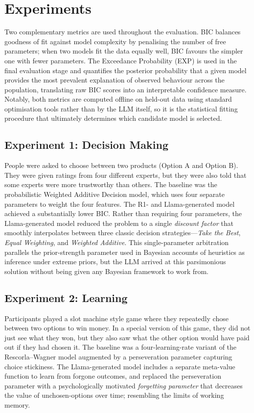 \section{Experiments}

Two complementary metrics are used throughout the evaluation. BIC balances goodness of fit against model complexity by penalising the number of free parameters; when two models fit the data equally well, BIC favours the simpler one with fewer parameters. The Exceedance Probability (EXP) is used in the final evaluation stage and quantifies the posterior probability that a given model provides the most prevalent explanation of observed behaviour across the population, translating raw BIC scores into an interpretable confidence measure. Notably, both metrics are computed offline on held-out data using standard optimisation tools rather than by the LLM itself, so it is the statistical fitting procedure that ultimately determines which candidate model is selected.

\subsection{Experiment 1: Decision Making}

People were asked to choose between two products (Option A and Option B). They were given ratings from four different experts, but they were also told that some experts were more trustworthy than others. The baseline was the probabilistic Weighted Additive Decision model, which uses four separate parameters to weight the four features. The R1- and Llama-generated model achieved a substantially lower BIC. Rather than requiring four parameters, the Llama-generated model reduced the problem to a single \emph{discount factor} that smoothly interpolates between three classic decision strategies---\emph{Take the Best}, \emph{Equal Weighting}, and \emph{Weighted Additive}. This single-parameter arbitration parallels the prior-strength parameter used in Bayesian accounts of heuristics as inference under extreme priors, but the LLM arrived at this parsimonious solution without being given any Bayesian framework to work from.

\subsection{Experiment 2: Learning}

Participants played a slot machine style game where they repeatedly chose between two options to win money. In a special version of this game, they did not just see what they won, but they also saw what the other option would have paid out if they had chosen it. The baseline was a four-learning-rate variant of the Rescorla--Wagner model augmented by a perseveration parameter capturing choice stickiness. The Llama-generated model includes a separate meta-value function to learn from forgone outcomes, and replaced the perseveration parameter with a psychologically motivated \emph{forgetting parameter} that decreases the value of unchosen-options over time; resembling the limits of working memory.

